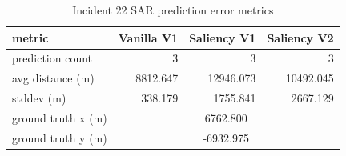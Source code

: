 \begin{table}[ht]
\centering
\caption{Incident 22 SAR prediction error metrics}
\label{tab:sar-incident-22}
\begin{tabular}{lrrr}
\hline
metric & Vanilla V1 & Saliency V1 & Saliency V2 \\
\hline
prediction count & 3 & 3 & 3 \\
avg distance (m) & 8812.647 & 12946.073 & 10492.045 \\
stddev (m) & 338.179 & 1755.841 & 2667.129 \\
ground truth x (m) & \multicolumn{3}{c}{6762.800} \\
ground truth y (m) & \multicolumn{3}{c}{-6932.975} \\
\hline
\end{tabular}
\end{table}

